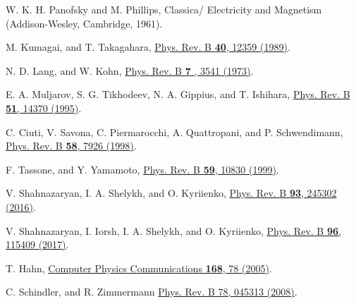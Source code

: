 \documentclass[prb,twocolumn,preprintnumbers,superscriptaddress]{revtex4}
\begin{document}
\begin{thebibliography}{99}
W. K. H. Panofsky and M. Phillips, Classica/ Electricity and Magnetism (Addison-Wesley, Cambridge, 1961). 

 M. Kumagai, and T. Takagahara,
\href{https://journals.aps.org/prb/abstract/10.1103/PhysRevB.40.12359}{Phys. Rev. B {\bf 40}, 12359 (1989)}.

N. D. Lang, and W. Kohn,
\href{https://journals.aps.org/prb/abstract/10.1103/PhysRevB.7.3541}{Phys. Rev. B {\bf 7 }, 3541 (1973)}.

E. A. Muljarov, S. G. Tikhodeev, N. A. Gippius, and T. Ishihara,
\href{https://journals.aps.org/prb/abstract/10.1103/PhysRevB.51.14370}{Phys. Rev. B {\bf 51}, 14370 (1995)}.



C. Ciuti, V. Savona, C. Piermarocchi, A. Quattropani, and P. Schwendimann,
\href{https://journals.aps.org/prb/abstract/10.1103/PhysRevB.58.7926}{Phys. Rev. B {\bf 58}, 7926 (1998)}.

 F. Tassone, and Y. Yamamoto, 
\href{https://journals.aps.org/prb/abstract/10.1103/PhysRevB.59.10830}{Phys. Rev. B \textbf{59}, 10830 (1999)}.


 V. Shahnazaryan, I. A. Shelykh, and O. Kyriienko, 
\href{https://journals.aps.org/prb/abstract/10.1103/PhysRevB.93.245302
}{Phys. Rev. B \textbf{93}, 245302 (2016)}.

  V. Shahnazaryan, I. Iorsh, I. A. Shelykh, and O. Kyriienko, 
\href{https://journals.aps.org/prb/abstract/10.1103/PhysRevB.96.115409}{Phys. Rev. B \textbf{96}, 115409 (2017)}.

 T. Hahn,
\href{https://www.sciencedirect.com/science/article/pii/S0010465505000792}{Computer Physics Communications {\bf 168}, 78 (2005)}.



C. Schindler, and R. Zimmermann
\href{https://journals.aps.org/prb/abstract/10.1103/PhysRevB.78.045313}{Phys. Rev. B 78, 045313 (2008)}.





\end{thebibliography}
\end{document}
